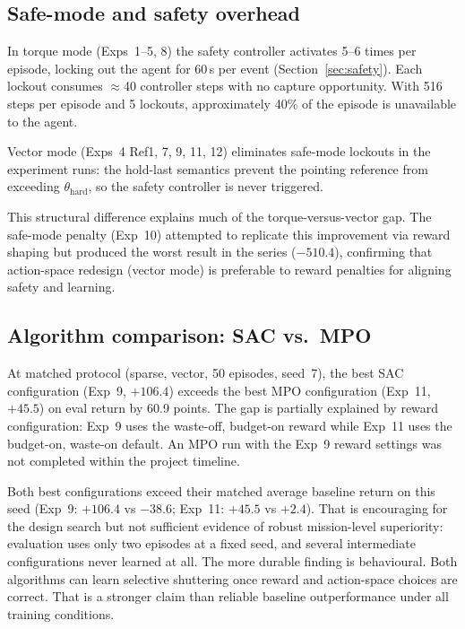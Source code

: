 \subsection{Safe-mode and safety overhead}
\label{sec:results-safemode}

In torque mode (Exps~1--5, 8) the safety controller activates 5--6 times per episode,
locking out the agent for 60\,s per event (Section~\ref{sec:safety}).
Each lockout consumes $\approx$40 controller steps with no capture opportunity.
With 516 steps per episode and 5 lockouts, approximately 40\% of the episode is unavailable to the agent.

Vector mode (Exps~4 Ref1, 7, 9, 11, 12) eliminates safe-mode lockouts in the experiment runs:
the hold-last semantics prevent the pointing reference from exceeding $\theta_\text{hard}$,
so the safety controller is never triggered.

This structural difference explains much of the torque-versus-vector gap.
The safe-mode penalty (Exp~10) attempted to replicate this improvement via reward shaping
but produced the worst result in the series ($-510.4$), confirming that action-space redesign (vector mode) is preferable to reward penalties for aligning safety and learning.

\subsection{Algorithm comparison: SAC vs.\ MPO}
\label{sec:results-algo}

At matched protocol (sparse, vector, 50 episodes, seed~7), the best SAC configuration (Exp~9, $+106.4$) exceeds the best MPO configuration (Exp~11, $+45.5$) on eval return by 60.9 points.
The gap is partially explained by reward configuration: Exp~9 uses the waste-off, budget-on reward while Exp~11 uses the budget-on, waste-on default.
An MPO run with the Exp~9 reward settings was not completed within the project timeline.

Both best configurations exceed their matched average baseline return on this seed (Exp~9: $+106.4$ vs $-38.6$; Exp~11: $+45.5$ vs $+2.4$).
That is encouraging for the design search but not sufficient evidence of robust mission-level superiority: evaluation uses only two episodes at a fixed seed, and several intermediate configurations never learned at all.
The more durable finding is behavioural.
Both algorithms can learn selective shuttering once reward and action-space choices are correct.
That is a stronger claim than reliable baseline outperformance under all training conditions.
